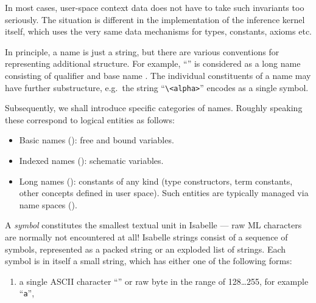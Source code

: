 \begin{isabellebody}
\begin{isamarkuptext}
  In most cases, user-space context data does not have to take such
  invariants too seriously.  The situation is different in the
  implementation of the inference kernel itself, which uses the very
  same data mechanisms for types, constants, axioms etc.%
\end{isamarkuptext}%
\isamarkuptrue%
%
\isamarkuptrue%
%
\begin{isamarkuptext}%
In principle, a name is just a string, but there are various
  conventions for representing additional structure.  For example,
  ``'' is considered as a long name consisting of
  qualifier  and base name .  The
  individual constituents of a name may have further substructure,
  e.g.\ the string ``\verb,\,\verb,<alpha>,'' encodes as a single
  symbol.

  \medskip Subsequently, we shall introduce specific categories of
  names.  Roughly speaking these correspond to logical entities as
  follows:
  \begin{itemize}

  \item Basic names (): free and bound
  variables.

  \item Indexed names (): schematic variables.

  \item Long names (): constants of any kind
  (type constructors, term constants, other concepts defined in user
  space).  Such entities are typically managed via name spaces
  ().

  \end{itemize}%
\end{isamarkuptext}%
\isamarkuptrue%
%
\isamarkuptrue%
%
\begin{isamarkuptext}%
A \emph{symbol} constitutes the smallest textual unit in
  Isabelle --- raw ML characters are normally not encountered at all!
  Isabelle strings consist of a sequence of symbols, represented as a
  packed string or an exploded list of strings.  Each symbol is in
  itself a small string, which has either one of the following forms:

  \begin{enumerate}

  \item a single ASCII character ``'' or raw byte in the
  range of 128\dots 255, for example ``\verb,a,'',


\end{enumerate}
\end{isamarkuptext}
\end{isabellebody}
